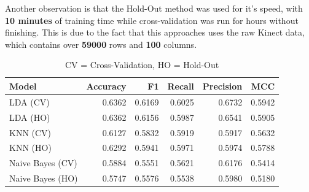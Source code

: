                 Another observation is that the Hold-Out method was used for it's speed, with \textbf{10 minutes} of training time while cross-validation was run for hours without finishing. This is due to the fact that this approaches uses the raw Kinect data, which contains over \textbf{59000} rows and \textbf{100} columns. 

                \begin{table}[ht]
                    \centering
                    \caption{CV = Cross-Validation, HO = Hold-Out}
                    \label{tab:correct_approach_cv}
                    \begin{tabular}{lrrrrr}
                        \toprule
                        \textbf{Model} & \textbf{Accuracy} & \textbf{F1} & \textbf{Recall} & \textbf{Precision} & \textbf{MCC} \\
                        \midrule
                        LDA (CV) & 0.6362 & 0.6169 & 0.6025 & 0.6732 & 0.5942 \\
                        LDA (HO) & 0.6362 & 0.6156 & 0.5987 & 0.6541 & 0.5905 \\
                        KNN (CV) & 0.6127 & 0.5832 & 0.5919 & 0.5917 & 0.5632 \\
                        KNN (HO) & 0.6292 & 0.5941 & 0.5971 & 0.5974 & 0.5788 \\
                        Naive Bayes (CV) & 0.5884 & 0.5551 & 0.5621 & 0.6176 & 0.5414 \\
                        Naive Bayes (HO) & 0.5747 & 0.5576 & 0.5538 & 0.5980 & 0.5180 \\
                        \bottomrule
                        \end{tabular}
                \end{table}
                
